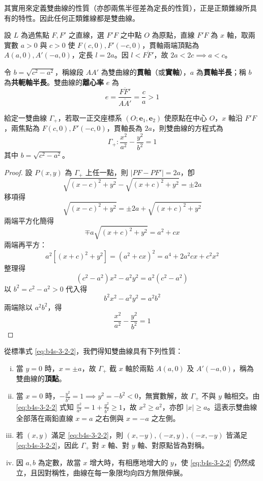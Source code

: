 其實用來定義雙曲線的性質（亦卽兩焦半徑差為定長的性質），正是正類錐線所具有的特性。因此任何正類錐線都是雙曲線。

設 $L$ 為過焦點 $F, F'$ 之直線，選 $F'F$ 之中點 $O$ 為原點，直線 $F'F$ 為 $x$ 軸，取兩實數 $a > 0$ 與 $c > 0$ 使 $F(c,0), F'(-c,0)$，貫軸兩端頂點為 $A(a,0), A'(-a,0)$，定長 $l = 2a$。因 $l < \overline{FF'}$，故 $2a < 2c \implies a < c$。

\begin{definition*}
令 $b = \sqrt{c^2 - a^2}$，稱線段 $AA'$ 為雙曲線的\textbf{貫軸}（或\textbf{實軸}），$a$ 為\textbf{貫軸半長}；稱 $b$ 為\textbf{共軛軸半長}。雙曲線的\textbf{離心率} $e$ 為
\[ e = \frac{\overline{FF'}}{\overline{AA'}} = \frac{c}{a} > 1 \]
\end{definition*}

\begin{proposition}
給定一雙曲線 $\Gamma_+$，若取一正交座標系 $(O; \mathbf{e}_1, \mathbf{e}_2)$ 使原點在中心 $O$，$x$ 軸沿 $F'F$，兩焦點為 $F(c,0), F'(-c,0)$，貫軸長為 $2a$，則雙曲線的方程式為
\begin{equation}
\Gamma_+ : \frac{x^2}{a^2} - \frac{y^2}{b^2} = 1 \label{eq:b4s-3-2-2}
\end{equation}
其中 $b = \sqrt{c^2 - a^2}$。
\end{proposition}

\begin{proof}
設 $P(x,y)$ 為 $\Gamma_+$ 上任一點，則 $|PF - PF'| = 2a$，卽
\[ \sqrt{(x-c)^2 + y^2} - \sqrt{(x+c)^2 + y^2} = \pm 2a \]
移項得
\[ \sqrt{(x-c)^2 + y^2} = \pm 2a + \sqrt{(x+c)^2 + y^2} \]
兩端平方化簡得
\[ \mp a\sqrt{(x+c)^2 + y^2} = a^2 + cx \]
兩端再平方：
\[ a^2[(x+c)^2 + y^2] = (a^2 + cx)^2 = a^4 + 2a^2cx + c^2x^2 \]
整理得
\[ (c^2 - a^2)x^2 - a^2y^2 = a^2(c^2 - a^2) \]
以 $b^2 = c^2 - a^2 > 0$ 代入得
\[ b^2x^2 - a^2y^2 = a^2b^2 \]
兩端除以 $a^2b^2$，得
\[ \frac{x^2}{a^2} - \frac{y^2}{b^2} = 1 \]
\end{proof}

從標準式 \eqref{eq:b4s-3-2-2}，我們得知雙曲線具有下列性質：
\begin{enumerate}[(i)]
  \item 當 $y=0$ 時，$x = \pm a$，故 $\Gamma_+$ 截 $x$ 軸於兩點 $A(a,0)$ 及 $A'(-a,0)$，稱為雙曲線的\textbf{頂點}。
  \item 當 $x=0$ 時，$-\frac{y^2}{b^2} = 1 \implies y^2 = -b^2 < 0$，無實數解，故 $\Gamma_+$ 不與 $y$ 軸相交。由 \eqref{eq:b4s-3-2-2} 式知 $\frac{x^2}{a^2} = 1 + \frac{y^2}{b^2} \ge 1$，故 $x^2 \ge a^2$，亦卽 $|x| \ge a$。這表示雙曲線全部落在兩鉛直線 $x = a$ 之右側與 $x = -a$ 之左側。
  \item 若 $(x,y)$ 滿足 \eqref{eq:b4s-3-2-2}，則 $(x,-y), (-x,y), (-x,-y)$ 皆滿足 \eqref{eq:b4s-3-2-2}，因此 $\Gamma_+$ 對 $x$ 軸、對 $y$ 軸、對原點皆為對稱。
  \item 因 $a, b$ 為定數，故當 $x$ 增大時，有相應地增大的 $y$，使 \eqref{eq:b4s-3-2-2} 仍然成立，且因對稱性，曲線在每一象限均向四方無限伸展。
\end{enumerate}

